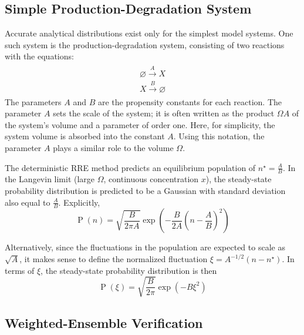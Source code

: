 \documentclass[english,letterpaper,12pt]{report}
\DeclareMathOperator{\Prob}{P}
\begin{document}
\begin{doublespacing}
\section{Simple Production-Degradation System} %
\label{sec:simple-pd}

Accurate analytical distributions exist only for the simplest model systems. One such system is the production-degradation system, consisting of two reactions with the equations:
\begin{align}
    \begin{gathered}
        \varnothing \xrightarrow{A} X \\
        X \xrightarrow {B} \varnothing
    \end{gathered}
    \label{eq:prod-deg-rxn}
\end{align}
The parameters $A$ and $B$ are the propensity constants for each reaction. The parameter $A$ sets the scale of the system; it is often written as the product $\Omega A$ of the system's volume and a parameter of order one. Here, for simplicity, the system volume is absorbed into the constant $A$. Using this notation, the parameter $A$ plays a similar role to the volume $\Omega$.

The deterministic RRE method predicts an equilibrium population of $n^\star = \frac{A}{B}$. In the Langevin limit (large $\Omega$, continuous concentration $x$), the steady-state probability distribution is predicted to be a Gaussian with standard deviation also equal to $\frac{A}{B}$. Explicitly,
\begin{equation}
    \Prob(n) = \sqrt{\frac{B}{2\pi A}}\exp\left( -\frac{B}{2 A} \left( n - \frac{A}{B} \right)^2  \right)
    \label{eq:prod-deg-dist}
\end{equation}

Alternatively, since the fluctuations in the population are expected to scale as $\sqrt{A}$, it makes sense to define the normalized fluctuation $\xi = A^{-1/2}(n - n^\star)$. In terms of $\xi$, the steady-state probability distribution is then
\begin{equation}
    \Prob(\xi) = \sqrt{\frac{B}{2\pi}} \exp(-B \xi^2)
    \label{eq:pd-dist-xi}
\end{equation}

\subsection{Weighted-Ensemble Verification} %
\label{sub:pd-we-verif}


\end{doublespacing}
\end{document}
